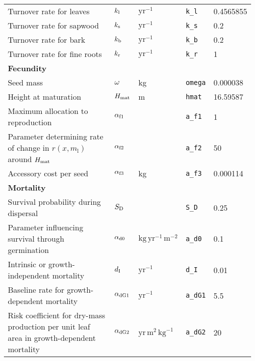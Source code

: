 \begin{tabular}{p{7cm}llll}
  Turnover rate for leaves & $k_{\rm l}$ & $\mathrm{yr}^{-1}$ & \texttt{k\_l} & 0.4565855 \\ 
  Turnover rate for sapwood & $k_{\rm s}$ & $\mathrm{yr}^{-1}$ & \texttt{k\_s} & 0.2 \\ 
  Turnover rate for bark & $k_{\rm b}$ & $\mathrm{yr}^{-1}$ & \texttt{k\_b} & 0.2 \\ 
  Turnover rate for fine roots & $k_{\rm r}$ & $\mathrm{yr}^{-1}$ & \texttt{k\_r} & 1 \\ 
  \textbf{Fecundity} &  &  &  &  \\ 
  Seed mass & $\omega$ & kg & \texttt{omega} & 0.000038 \\ 
  Height at maturation & $H_{{\rm mat}}$ & m & \texttt{hmat} & 16.59587 \\ 
  Maximum allocation to reproduction & $\alpha_{\rm f1}$ &  & \texttt{a\_f1} & 1 \\ 
  Parameter determining rate of change in $r(x, m_\textrm{l})$ around $H_{\rm mat}$ & $\alpha_{\rm f2}$ &  & \texttt{a\_f2} & 50 \\ 
  Accessory cost per seed & $\alpha_{\rm f3}$ & kg & \texttt{a\_f3} & 0.000114 \\ 
  \textbf{Mortality} &  &  &  &  \\ 
  Survival probability during dispersal & $S_{\rm D}$ &  & \texttt{S\_D} & 0.25 \\ 
  Parameter influencing survival through germination & $\alpha_{\rm d0}$ & $\mathrm{kg}\,\mathrm{yr}^{-1}\,\mathrm{m}^{-2}$ & \texttt{a\_d0} & 0.1 \\ 
  Intrinsic or growth-independent mortality & $d_{\rm I}$ & $\mathrm{yr}^{-1}$ & \texttt{d\_I} & 0.01 \\ 
  Baseline rate for growth-dependent mortality & $\alpha_{\rm dG1}$ & $\mathrm{yr}^{-1}$ & \texttt{a\_dG1} & 5.5 \\ 
  Risk coefficient for dry-mass production per unit leaf area in growth-dependent mortality & $\alpha_{\rm dG2}$ & $\mathrm{yr}\,\mathrm{m}^{2}\,\mathrm{kg}^{-1}$ & \texttt{a\_dG2} & 20 \\ 
   \hline
\end{tabular}
